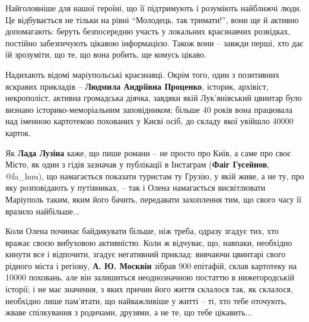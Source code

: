Найголовніше для нашої героїні, що її підтримують і розуміють найближчі люди.
Це відбувається не тільки на рівні \enquote{Молодець, так тримати!}, вони ще й активно
допомагають: беруть безпосередню участь у локальних краєзнавчих розвідках,
постійно забезпечують цікавою інформацією. Також вони – завжди перші, хто дає
їй зрозуміти, що те, що вона робить, ще комусь цікаво.


Надихають відомі маріупольські краєзнавці. Окрім того, один з позитивних
яскравих прикладів – \textbf{Людмила Андріївна Проценко}, історик, архівіст,
некрополіст, активна громадська діячка, завдяки якій Лук'янівський цвинтар було
визнано історико-меморіальним заповідником; більше 40 років вона працювала над
іменною картотекою похованих у Києві осіб, до складу якої увійшло 40000 карток.

Як \textbf{Лада Лузіна} каже, що пише романи – не просто про Київ, а саме про своє
Місто, як один з гідів зазначав у публікації в Інстаграм (\textbf{Фаіг Гусейнов},
@fa\_huu), що намагається показати туристам ту Грузію, у якій живе, а не ту, про
яку розповідають у путівниках, – так і Олена намагається висвітлювати Маріуполь
таким, яким його бачить, передавати захоплення тим, що свого часу її вразило
найбільше...

Коли Олена починає байдикувати більше, ніж треба, одразу згадує тих, хто вражає
своєю вибуховою активністю. Коли ж відчуває, що, навпаки, необхідно кинути все
і відпочити, згадує негативний приклад: вивчаючи цвинтарі свого рідного міста і
регіону, \textbf{А. Ю. Москвін} зібрав 900 епітафій, склав картотеку на 10000 поховань,
але він залишиться неоднозначною постаттю в нижегородській історії; і не має
значення, з яких причин його життя склалося так, як склалося, необхідно лише
пам'ятати, що найважливіше у житті – ті, хто тебе оточують, жваве спілкування з
родичами, друзями, а не те, що тебе цікавить...


